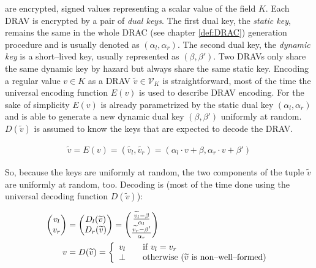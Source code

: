  are encrypted, signed values
representing a scalar value of the field $K$. Each DRAV is encrypted by a pair
of \emph{dual keys}. The first dual key, the \emph{static key}, remains the same
in the whole DRAC (see chapter \ref{def:DRAC}) generation procedure and is
usually denoted as $(\alpha_l, \alpha_r)$. The second dual key, the
\emph{dynamic key} is a short--lived key, usually represented as $(\beta,
\beta')$. Two DRAVs only share the same dynamic key by hazard but always share
the same static key. Encoding a regular value $v \in K$ as a DRAV
$\widetilde{v} \in \mathcal{V}_K$ is straightforward, most of the time the
universal encoding function $E(v)$ is used to describe DRAV encoding. For the
sake of simplicity $E(v)$ is already parametrized by the static dual key
$(\alpha_l, \alpha_r)$ and is able to generate a new dynamic dual key $(\beta,
\beta')$ uniformly at random. $D(\widetilde{v})$ is assumed to know the keys
that are expected to decode the DRAV.

\begin{align*}
  \widetilde{v} = E(v) = (\widetilde{v_l}, \widetilde{v_r}) =
    (\alpha_l \cdot v + \beta, \alpha_r \cdot v + \beta')
\end{align*}

\noindent{}So, because the keys are uniformly at random, the two components of
the tuple $\widetilde{v}$ are uniformly at random, too. Decoding is (most of the
time done using the universal decoding function $D(\widetilde{v})$):

\begin{align}
  \label{eqn:keys-assumed}
\begin{pmatrix}v_l\\v_r\end{pmatrix} &=
\begin{pmatrix}D_l(\widetilde{v})\\D_r(\widetilde{v})\end{pmatrix} =
  \begin{pmatrix}
    \frac{\widetilde{v_l} - \beta}{\alpha_l}\\
    \frac{\widetilde{v_r} - \beta'}{\alpha_r}
  \end{pmatrix}\\
  v &= D(\widetilde{v}) =
  \left\{
    \begin{array}{l l}
      v_l & \quad \text{if}~v_l = v_r\\
      \bot & \quad \text{otherwise ($\widetilde{v}$ is non--well--formed)}\\
    \end{array}\right.
\end{align}

